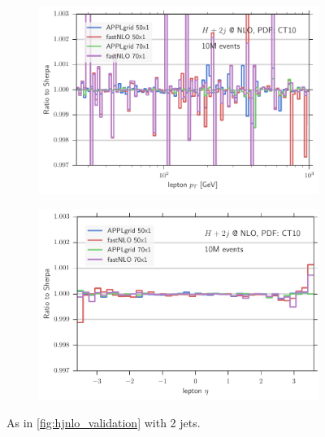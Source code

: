 \begin{figure}
\begin{subfigure}[]{0.49\textwidth}
	\includegraphics[width=\textwidth]{images/hjjnlo_lpt_70v50.pdf}
\end{subfigure}
\hfill
\begin{subfigure}[]{0.49\textwidth}
	\includegraphics[width=\textwidth]{images/hjjnlo_leta_70v50.pdf}
\end{subfigure}
\caption{As in \cref{fig:hjnlo_validation} with 2 jets.}
\label{fig:hjjnlo_validation}
\end{figure}
%
